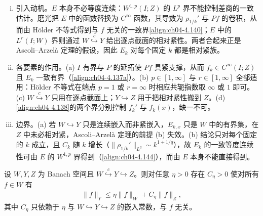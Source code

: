\documentclass[../../main.tex]{subfiles}%
\begin{document}
\begin{remark}\label{remark:ch04-磨光紧动机}
\begin{enumerate}[(i)]
\item 引入动机。$E$ 本身不必等度连续：$W^{1,p}(I;Z)$ 的 $L^p$ 界不能控制差商的一致估计。磨光把 $E$ 中的函数替换为 $C^\infty$ 函数，其导数为 $\rho_{1/k}'$ 与 $Pf$ 的卷积，从而由 Hölder 不等式得到与 $f$ 无关的一致界\eqref{align:ch04-4.140}；$E$ 中的 $L^r(I;W)$ 界则通过 $W\overset{c}{\hookrightarrow}Y$ 给出逐点截面的相对紧性。两者合起来正是 Ascoli--Arzelà 定理的假设，因此 $E_k$ 对每个固定 $k$ 都是相对紧族。

\item 各要素的作用。(a) $I$ 有界与 $P$ 的延拓使 $Pf$ 具紧支撑，从而 $f_k\in C^\infty(I;Z)$ 且 $E_k$ 一致有界（\eqref{align:ch04-4.137a}）。(b) $p\in[1,\infty]$ 与 $r\in[1,\infty]$ 全部适用：Hölder 不等式在端点 $p=1$ 或 $r=\infty$ 时相应共轭指数取 $\infty$ 或 $1$ 即可。(c) $W\overset{c}{\hookrightarrow}Y$ 只用在逐点截面上；$Y\hookrightarrow Z$ 用于把相对紧性搬到 $Z$。(d) \eqref{align:ch04-4.138}的两个界分别控制 $f_k'$ 与 $f_k(x)$，缺一不可。

\item 边界。(a) 若 $W\hookrightarrow Y$ 只是连续嵌入而非紧嵌入，$E_{k,x}$ 只是 $W$ 中的有界集，在 $Z$ 中未必相对紧，Ascoli--Arzelà 定理的前提 (b) 失效。(b) 结论只对每个固定的 $k$ 成立，且 $C_k$ 随 $k$ 增长（$\|\rho_{1/k}'\|_{L^q}\sim k^{1+1/q}$），故 $E_k$ 的一致等度连续性可由 $E$ 的 $W^{1,p}$ 界得到（\eqref{align:ch04-4.144}），而由 $E$ 本身不能直接得到。
\end{enumerate}
\end{remark}

\begin{lemma}\label{lemma:ch04-插值不等式}
设 $W,Y,Z$ 为 Banach 空间且 $W\overset{c}{\hookrightarrow}Y\hookrightarrow Z$。则对任意 $\eta>0$ 存在 $C_\eta>0$ 使对所有 $f\in W$ 有
\begin{align}
\|f\|_Y\leqslant\eta\|f\|_W+C_\eta\|f\|_Z, \label{align:ch04-4.141}
\end{align}
其中 $C_\eta$ 只依赖于 $\eta$ 与 $W\hookrightarrow Y\hookrightarrow Z$ 的嵌入常数，与 $f$ 无关。
\end{lemma}
\end{document}
